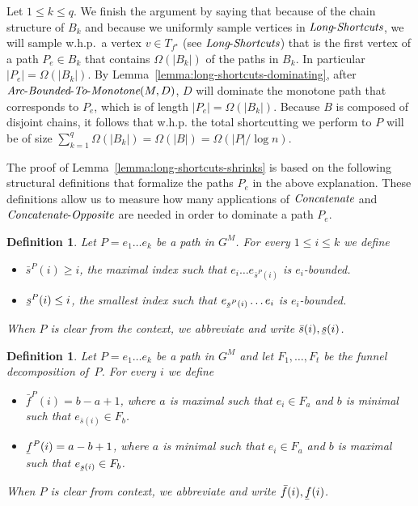 \documentclass[11pt]{article}
\newtheorem{definition}[theorem]{Definition}
\newcommand{\ubar}[1]{\underaccent{\bar}{{#1}}}
\newcommand{\Concat}{\mbox{{\it Concatenate}}}
\newcommand{\CO}{\mbox{{\it Concatenate}-{\it Opposite}}}
\newcommand{\LS}{\mbox{{\it Long}-{\it Shortcuts}}}
\newcommand{\Extend}{\mbox{{\it Arc}-{\it Bounded}-{\it To}-{\it Monotone}}}
\begin{document}
Let $1\le k \le q$. We finish the argument by saying that because of the chain structure of $B_k$ and because we uniformly sample vertices in $\LS$, we will sample w.h.p.\ a vertex $v \in T_{f^\star}$ (see $\LS$) that is the first vertex of a path $P_e  \in B_k$  
that contains $\Omega(|B_k|)$ of the paths in $B_k$. In particular $|
P_e| = \Omega(|B_k|)$. By Lemma~\ref{lemma:long-shortcuts-dominating}, after $\Extend(M,D)$, $D$ will dominate the monotone path that corresponds to $P_e$, which is of length $|P_e| = \Omega(|B_k|)$. Because $B$ is composed of disjoint chains, it follows that w.h.p. the total shortcutting we perform to $P$ will be of size $\sum_{k=1}^q \Omega(|B_k|) = \Omega(|B|) = \Omega(|P|/\log n)$. 


The proof of Lemma~\ref{lemma:long-shortcuts-shrinks} is based on the following structural definitions that formalize the paths $P_e$ in the above explanation.
These definitions allow us to measure how many applications of $\Concat$ and $\CO$ are needed in order to dominate a path $P_e$.


\begin{definition}
    Let $P=e_1 \ldots e_k$ be a path in $G^M$. For every $1\le i \le k$ we define
    \begin{itemize}
        \item $\bar{s}^P(i)\ge i$, the maximal index such that $e_i \ldots e_{\bar{s}^P(i)}$ is $e_i$-bounded.
        \item $\ubar{s}^P(i)\le i$, the smallest index such that $ e_{\ubar{s}^P(i)} \ldots e_i$ is $e_i$-bounded.
    \end{itemize}
    When $P$ is clear from the context, we abbreviate and write $\bar{s}(i),\ubar{s}(i)$.
\end{definition}

\begin{definition}\label{def:funnel-distance}
    Let $P= e_1 \ldots e_k$ be a path in $G^M$ and let $F_1,\ldots, F_t$ be the funnel decomposition of~$P$. For every $i$ we define
    \begin{itemize}
        \item $\bar{f}^P(i)=b-a+1$, where $a$ is maximal such that $e_i \in F_{a}$ and $b$ is minimal such that $e_{\bar{s}(i)}\in F_{b}$.
        \item $\ubar{f}^P(i)=a-b+1$, where  $a$ is minimal such that $e_i \in F_{a}$ and $b$ is maximal such that $e_{\ubar{s}(i)}\in F_{b}$.
    \end{itemize}
    When $P$ is clear from context, we abbreviate and write $\bar{f}(i),\ubar{f}(i)$.
\end{definition}
\end{document}
